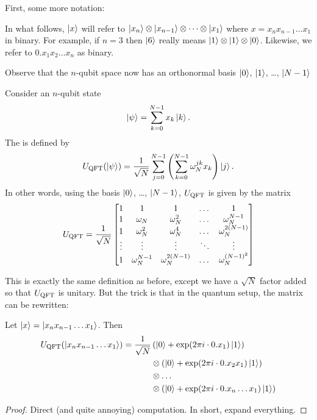 First, some more notation:
\begin{abuse}
	In what follows, $\ket{x}$ will refer to
	$\ket{x_n} \otimes \ket{x_{n-1}} \otimes \dots \otimes \ket{x_1}$
	where $x = x_n x_{n-1} \dots x_1$ in binary.
	For example, if $n = 3$
	then $\ket{6}$ really means $\ket1 \otimes \ket1 \otimes \ket 0$.
	Likewise, we refer to $0.x_1x_2 \dots x_n$ as binary.
\end{abuse}
Observe that the $n$-qubit space now has an
orthonormal basis $\ket0$, $\ket1$, \dots, $\ket{N-1}$

\begin{definition}
	Consider an $n$-qubit state
	\[ \ket\psi = \sum_{k=0}^{N-1} x_k \ket{k}. \]
	The  is defined by
	\[
		U_{\mathrm{QFT}}(\ket\psi) = \frac{1}{\sqrt N}\sum_{j=0}^{N-1}
		\left( \sum_{k=0}^{N-1} \omega_N^{jk} x_k \right) \ket{j}.
	\]
	In other words, using the basis $\ket0$, \dots, $\ket{N-1}$,
	$U_{\mathrm{QFT}}$ is given by the matrix
	\[
		U_{\mathrm{QFT}} = \frac{1}{\sqrt N}
		\begin{bmatrix}
			1 & 1 & 1 & \dots & 1 \\
			1 & \omega_N & \omega_N^2 & \dots & \omega_N^{N-1} \\
			1 & \omega_N^2 & \omega_N^4 & \dots & \omega_N^{2(N-1)} \\
			\vdots & \vdots & \vdots & \ddots & \vdots \\
			1 & \omega_N^{N-1} & \omega_N^{2(N-1)} & \dots & \omega_N^{(N-1)^2}
		\end{bmatrix}
	\]
\end{definition}
This is exactly the same definition as before,
except we have a $\sqrt N$ factor added so that $U_{\mathrm{QFT}}$ is unitary.
But the trick is that in the quantum setup, the matrix can be rewritten:
\begin{proposition}
	Let $\ket x = \ket{x_n x_{n-1} \dots x_1}$.
	Then
	\begin{align*}
		U_{\mathrm{QFT}}( \ket{x_n x_{n-1} \dots x_1} )
		= \frac{1}{\sqrt N} &
		\left( \ket0 +\exp(2\pi i \cdot 0.x_1) \ket 1 \right) \\
		&\otimes \left( \ket0 +\exp(2\pi i \cdot 0.x_2x_1) \ket 1 \right) \\
		&\otimes \dots  \\
		&\otimes \left( \ket0 +\exp(2\pi i \cdot 0.x_n\dots x_1) \ket 1 \right)
	\end{align*}
\end{proposition}
\begin{proof}
	Direct (and quite annoying) computation.
	In short, expand everything.
\end{proof}

